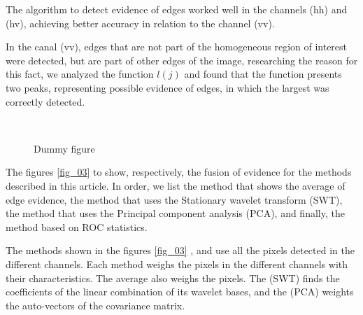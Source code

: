 \documentclass[conference]{IEEEtran}
\begin{document}
{{{{The algorithm to detect evidence of edges worked well in the channels (hh) and (hv), achieving better accuracy in relation to the channel (vv).  

In the canal (vv), edges that are not part of the homogeneous region of interest were detected, but are part of other edges of the image, researching the reason for this fact, we analyzed the function $l(j)$ and found that the function presents two peaks, representing possible evidence of edges, in which the largest was correctly detected. 



   \begin{figure}[!ht]
     \hfill
     \\
     \centering
     \caption{Dummy figure}
     \label{fig_02}
   \end{figure}

The figures \ref{fig_03}  to  show, respectively, the fusion of evidence for the methods described in this article. In order, we list the method that shows the average of edge evidence, the method that uses the Stationary wavelet transform (SWT), the method that uses the Principal component analysis (PCA), and finally, the method based on ROC statistics.

The methods shown in the figures \ref{fig_03} ,  and  use all the pixels detected in the different channels. Each method weighs the pixels in the different channels with their characteristics. The average also weighs the pixels. The (SWT) finds the coefficients of the linear combination of its wavelet bases, and the (PCA) weights the auto-vectors of the covariance matrix.

}}}}
\end{document}
